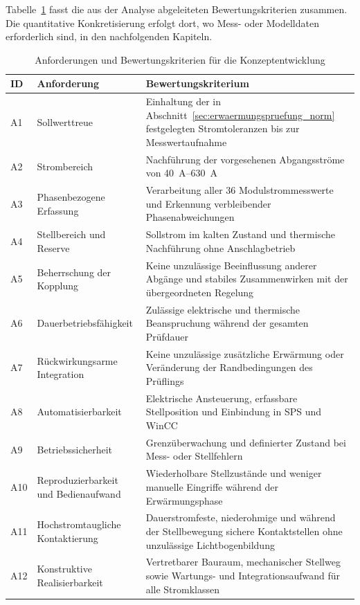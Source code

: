Tabelle~\ref{tab:anforderungen_optimierung} fasst die aus der Analyse
abgeleiteten Bewertungskriterien zusammen. Die quantitative Konkretisierung
erfolgt dort, wo Mess- oder Modelldaten erforderlich sind, in den
nachfolgenden Kapiteln.

\begin{table}[H]
    \centering
    \caption{Anforderungen und Bewertungskriterien für die
    Konzeptentwicklung}
    \label{tab:anforderungen_optimierung}
    \small
    \begin{tabular}{p{}p{}p{}}
        \toprule
        ID & Anforderung & Bewertungskriterium \\
        \midrule
        A1 & Sollwerttreue &
        Einhaltung der in Abschnitt~\ref{sec:erwaermungspruefung_norm}
        festgelegten Stromtoleranzen bis zur Messwertaufnahme \\
        A2 & Strombereich &
        Nachführung der vorgesehenen Abgangsströme von
        \SIrange{40}{630}{\ampere} \\
        A3 & Phasenbezogene Erfassung &
        Verarbeitung aller 36 Modulstrommesswerte und Erkennung
        verbleibender Phasenabweichungen \\
        A4 & Stellbereich und Reserve &
        Sollstrom im kalten Zustand und thermische Nachführung ohne
        Anschlagbetrieb \\
        A5 & Beherrschung der Kopplung &
        Keine unzulässige Beeinflussung anderer Abgänge und stabiles
        Zusammenwirken mit der übergeordneten Regelung \\
        A6 & Dauerbetriebsfähigkeit &
        Zulässige elektrische und thermische Beanspruchung während der
        gesamten Prüfdauer \\
        A7 & Rückwirkungsarme Integration &
        Keine unzulässige zusätzliche Erwärmung oder Veränderung der
        Randbedingungen des Prüflings \\
        A8 & Automatisierbarkeit &
        Elektrische Ansteuerung, erfassbare Stellposition und Einbindung in
        SPS und WinCC \\
        A9 & Betriebssicherheit &
        Grenzüberwachung und definierter Zustand bei Mess- oder
        Stellfehlern \\
        A10 & Reproduzierbarkeit und Bedienaufwand &
        Wiederholbare Stellzustände und weniger manuelle Eingriffe während
        der Erwärmungsphase \\
        A11 & Hochstromtaugliche Kontaktierung &
        Dauerstromfeste, niederohmige und während der Stellbewegung sichere
        Kontaktstellen ohne unzulässige Lichtbogenbildung \\
        A12 & Konstruktive Realisierbarkeit &
        Vertretbarer Bauraum, mechanischer Stellweg sowie Wartungs- und
        Integrationsaufwand für alle Stromklassen \\
        \bottomrule
    \end{tabular}
\end{table}

